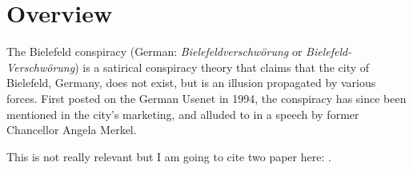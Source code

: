 \section{Overview}
The Bielefeld conspiracy (German: \textit{Bielefeldverschwörung} or \textit{Bielefeld-Verschwörung}) is a satirical conspiracy  theory that claims that the city of Bielefeld, Germany, does not exist, but is an illusion propagated by various forces. 
First posted on the German Usenet in 1994, the conspiracy has since been mentioned in the city's marketing, and alluded to in a speech by former Chancellor Angela Merkel. 

This is not really relevant but I am going to cite two paper here: \textcite{Ye2023, ye2023learning}.
